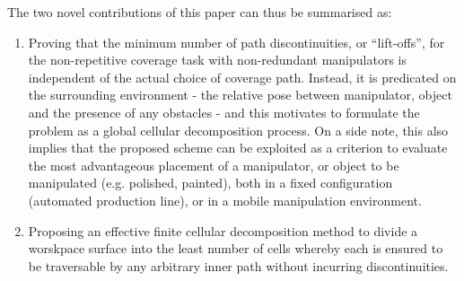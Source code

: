 \documentclass[journal]{IEEEtran}
\begin{document}

The two novel contributions of this paper can thus be summarised as: 
\begin{enumerate}
\item Proving that the minimum number of path discontinuities, or ``lift-offs'', for the non-repetitive coverage task with non-redundant manipulators is independent of the actual choice of coverage path. 
Instead, it is predicated on the surrounding environment - the relative pose between manipulator, object and the presence of any obstacles - and this motivates to formulate the problem as a global cellular decomposition process.
On a side note, this also implies that the proposed scheme can be exploited as a criterion to evaluate the most advantageous placement of a manipulator, or object to be manipulated (e.g. polished, painted), both in a fixed configuration (automated production line), or in a mobile manipulation environment. 
\item Proposing an effective finite cellular decomposition method to divide a worskpace surface into the least number of cells whereby each is ensured to be traversable by any arbitrary inner path without incurring discontinuities.
\end{enumerate}
\end{document}
